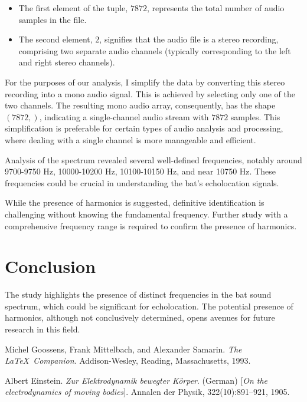 \documentclass{article}
\begin{document}
\begin{multicols}{2}
\begin{itemize}
    \item The first element of the tuple, $7872$, represents the total number of audio samples in the file.
    \item The second element, $2$, signifies that the audio file is a stereo recording, comprising two separate audio channels (typically corresponding to the left and right stereo channels).
\end{itemize}

For the purposes of our analysis, I simplify the data by converting this stereo recording into a mono audio signal. This is achieved by selecting only one of the two channels. The resulting mono audio array, consequently, has the shape $(7872,)$, indicating a single-channel audio stream with $7872$ samples. This simplification is preferable for certain types of audio analysis and processing, where dealing with a single channel is more manageable and efficient.

Analysis of the spectrum revealed several well-defined frequencies, notably around 9700-9750 Hz, 10000-10200 Hz, 10100-10150 Hz, and near 10750 Hz. These frequencies could be crucial in understanding the bat's echolocation signals.

While the presence of harmonics is suggested, definitive identification is challenging without knowing the fundamental frequency. Further study with a comprehensive frequency range is required to confirm the presence of harmonics.

\section{Conclusion}
The study highlights the presence of distinct frequencies in the bat sound spectrum, which could be significant for echolocation. The potential presence of harmonics, although not conclusively determined, opens avenues for future research in this field.

\begin{thebibliography}{9}
Michel Goossens, Frank Mittelbach, and Alexander Samarin. 
\textit{The \LaTeX\ Companion}. 
Addison-Wesley, Reading, Massachusetts, 1993.
 
Albert Einstein. 
\textit{Zur Elektrodynamik bewegter K{\"o}rper}. (German) 
[\textit{On the electrodynamics of moving bodies}]. 
Annalen der Physik, 322(10):891–921, 1905.
\end{thebibliography}


\end{multicols}
\end{document}
